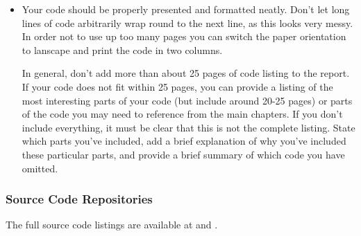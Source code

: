 \begin{mdframed}
	\begin{itemize}
		\item Your code should be properly presented and formatted neatly. Don't let long lines of code arbitrarily wrap round to the next line, as this looks very messy. In order not to use up too many pages you can switch the paper orientation to lanscape and print the code in two columns.

		In general, don't add more than about 25 pages of code listing to the report. If your code does not fit within 25 pages, you can provide a listing of the most interesting parts of your code (but include around 20-25 pages) or parts of the code you may need to reference from the main chapters. If you don't include everything, it must be clear that this is not the complete listing. State which parts you've included, add a brief explanation of why you've included these particular parts, and provide a brief summary of which code you have omitted.
	\end{itemize}
\end{mdframed}

\subsubsection{Source Code Repositories}

The full source code listings are available at \cite{heisentestInstrumentation} and \cite{heisentestPlugin}.
